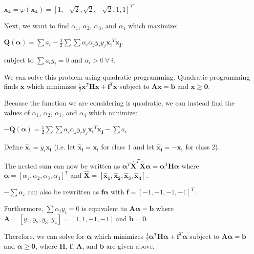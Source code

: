 \documentclass[fleqn]{article}
\begin{document}
\begin{enumerate}
	$\mathbf{x_4} = \varphi(\mathbf{x_4}) = [1,-\sqrt{2},\sqrt{2},-\sqrt{2},1,1]^T$
	
	Next, we want to find $\alpha_1$, $\alpha_2$, $\alpha_3$, and $\alpha_4$ which maximize:
	
	$\mathbf{Q(\boldsymbol{\alpha})} = \sum{a_i} - \frac{1}{2}\sum{\sum{\alpha_i\alpha_jy_iy_j\mathbf{x_i}^T\mathbf{x_j}}}$.
	
	subject to $\sum{a_iy_i} = 0$ and $\alpha_i > 0\ \forall\ i$.
	
	We can solve this problem using quadratic programming. Quadratic programming finds $\mathbf{x}$ which minimizes $\frac{1}{2}\mathbf{x}^T\mathbf{H}\mathbf{x} + \mathbf{f}^T\mathbf{x}$ subject to $\mathbf{Ax} = \mathbf{b}$ \newline and $\mathbf{x} \geq \mathbf{0}$.

	Because the function we are considering is quadratic, we can instead find the values of $\alpha_1$, $\alpha_2$, $\alpha_3$, and $\alpha_4$ which minimize:
	
	$-\mathbf{Q(\boldsymbol{\alpha})} = \frac{1}{2}\sum{\sum{\alpha_i\alpha_jy_iy_j\mathbf{x_i}^T\mathbf{x_j}}} - \sum{a_i}$
	
	Define $\mathbf{\hat{x}_i} = y_i\mathbf{x_i}$ (i.e. let $\mathbf{\hat{x}_i} = \mathbf{x_i}$ for class 1 and let $\mathbf{\hat{x}_i} = -\mathbf{x_i}$ for class 2).
	
	The nested sum can now be written as $\boldsymbol{\alpha}^T\mathbf{\hat{X}}^T\mathbf{\hat{X}}\boldsymbol{\alpha} = \boldsymbol{\alpha}^T\mathbf{H}\boldsymbol{\alpha}$ \newline where $\boldsymbol{\alpha} = [\alpha_1,\alpha_2,\alpha_3,\alpha_4]^T$ and $\mathbf{\hat{X}} = [\mathbf{\hat{x}_1},\mathbf{\hat{x}_2}, \mathbf{\hat{x}_3}, \mathbf{\hat{x}_4}]$.
	
	$-\sum{\alpha_i}$ can also be rewritten as $\mathbf{f}\boldsymbol{\alpha}$ with $\mathbf{f} = [-1,-1,-1,-1]^T$.
	  
	Furthermore, $\sum{\alpha_iy_i} = 0$ is equivalent to $\mathbf{A}\boldsymbol{\alpha} = \mathbf{b}$ where \newline $\mathbf{A} = [y_1,y_2,y_3,y_4] = [1,1,-1,-1]$ and $\mathbf{b} = 0$.
	
	Therefore, we can solve for $\boldsymbol{\alpha}$ which minimizes $\frac{1}{2}\boldsymbol{\alpha}^T\mathbf{H}\boldsymbol{\alpha} + \mathbf{f}^T\boldsymbol{\alpha}$ subject to $\mathbf{A}\boldsymbol{\alpha} = \mathbf{b}$ and $\boldsymbol{\alpha} \geq \mathbf{0}$, where $\mathbf{H}$, $\mathbf{f}$, $\mathbf{A}$, and $\mathbf{b}$ are given above.
	

\end{enumerate}
\end{document}
